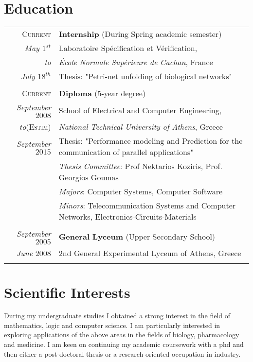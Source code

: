 \documentclass[a4paper,10pt]{article}
\begin{document}
\section{Education}
\begin{tabular}[l]{r|p{1400pt}}	
\textsc{Current} & \textbf{Internship }(During Spring academic semester)\\
\textit{May $1^{st}$} & Laboratoire Spécification et Vérification,\\
\textit{to}} &\normalsize\emph {École Normale Supérieure de Cachan}, France\\
\textit{July $18^{th}$} &Thesis: "Petri-net unfolding of biological networks"\\
\multicolumn{2}{c}{} \\

\textsc{Current} & \textbf{Diploma }($5$-year degree)\\
\textit{September $2008$} & School of Electrical and Computer Engineering,\\
\textit{to}\textsc{(Estim)} &\normalsize\emph {National Technical University of Athens}, Greece\\
\textit{September $2015$} &Thesis: "Performance modeling and Prediction for the communication of parallel applications"\\
&\emph{Thesis Committee}: Prof Nektarios Koziris, Prof. Georgios Goumas\\
&\emph{Majors}: Computer Systems, Computer Software\\
&\emph{Minors}: Telecommunication Systems and Computer Networks, Electronics-Circuits-Materials\\\multicolumn{2}{c}{} \\
\textit{September $2005$} & \textbf{General Lyceum }(Upper Secondary School)\\
\textit{June $2008$} & 2nd General Experimental Lyceum of Athens, Greece\\\multicolumn{2}{c}{}
\end{tabular}

\section{Scientific Interests}
During my undergraduate studies I obtained a strong interest in the field of mathematics, logic and computer science. I am particularly interested in exploring applications of the above areas in the fields of biology, pharmacology and medicine. I am keen on continuing my academic coursework with a phd and then either a post-doctoral thesis or a research oriented occupation in industry. 
 
\end{document}
